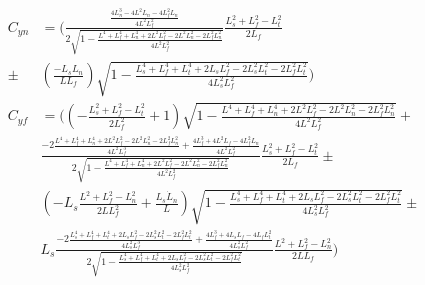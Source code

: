 \documentclass[11pt, landscape]{article}
\begin{document}
\begin{align}
  C_{yn} &= \Bigg(\frac{\frac{4L_n^3 - 4L^2L_n - 4L_f^2L_n}{4L^2L_f^2}}{2\sqrt{1-\frac{L^4 + L_f^4 + L_n^4 + 2L^2L_f^2 - 2L^2L_n^2 - 2L_f^2L_n^2}{4L^2L_f^2}}}\frac{L_{s}^2+L_f^2-L_{t}^2}{2L_f}\\
    \pm &\left(\frac{-L_sL_n}{LL_f}\right)\sqrt{1-\frac{L_s^4 + L_f^4 + L_t^4 + 2L_sL_f^2 - 2L_s^2L_t^2 - 2L_f^2L_t^2}{4L_s^2L_f^2}}\Bigg)\\
  C_{yf} &= \Bigg(\left(-\frac{L_{s}^2+L_f^2-L_{t}^2}{2L_f^2} + 1\right)\sqrt{1-\frac{L^4 + L_f^4 + L_n^4 + 2L^2L_f^2 - 2L^2L_n^2 - 2L_f^2L_n^2}{4L^2L_f^2}} +\\
    &\frac{-2\frac{L^4 + L_f^4 + L_n^4 + 2L^2L_f^2 - 2L^2L_n^2 - 2L_f^2L_n^2}{4L^2L_f^3} + \frac{4L_f^3 + 4L^2L_f - 4L_f^2L_n}{4L^2L_f^2}}{2\sqrt{1-\frac{L^4 + L_f^4 + L_n^4 + 2L^2L_f^2 - 2L^2L_n^2 - 2L_f^2L_n^2}{4L^2L_f^2}}}\frac{L_{s}^2+L_f^2-L_{t}^2}{2L_f} \pm\\
    &\left(-L_s\frac{L^2+L_f^2-L_n^2}{2LL_f^2} + \frac{L_s\dot{L}_n}{L}\right)\sqrt{1-\frac{L_s^4 + L_f^4 + L_t^4 + 2L_sL_f^2 - 2L_s^2L_t^2 - 2L_f^2L_t^2}{4L_s^2L_f^2}} \pm\\
    &L_s\frac{-2\frac{L_s^4 + L_f^4 + L_t^4 + 2L_sL_f^2 - 2L_s^2L_t^2 - 2L_f^2L_t^2}{4L_s^2L_f^3} + \frac{4L_f^3 + 4L_sL_f - 4L_fL_t^2}{4L_s^2L_f^2}}{2\sqrt{1-\frac{L_s^4 + L_f^4 + L_t^4 + 2L_sL_f^2 - 2L_s^2L_t^2 - 2L_f^2L_t^2}{4L_s^2L_f^2}}}\frac{L^2+L_f^2-L_n^2}{2LL_f}\Bigg)\\
\end{align}
\end{document}
